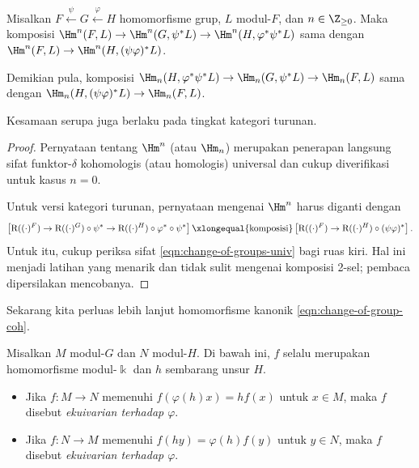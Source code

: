 \begin{lemma}\label{prop:change-of-group-compo}
	Misalkan $F\xleftarrow{\psi}G\xleftarrow{\varphi}H$ homomorfisme grup,
	$L$ modul-$F$, dan $n\in\Z_{\geq0}$. Maka komposisi
	$\Hm^n(F,L)\to\Hm^n(G,\psi^*L)\to
	\Hm^n(H,\varphi^*\psi^*L)$ sama dengan
	$\Hm^n(F,L)\to\Hm^n(H,(\psi\varphi)^*L)$.

	Demikian pula, komposisi
	$\Hm_n(H,\varphi^*\psi^*L)\to\Hm_n(G,\psi^*L)\to\Hm_n(F,L)$ sama dengan
	$\Hm_n(H,(\psi\varphi)^*L)\to\Hm_n(F,L)$.

	Kesamaan serupa juga berlaku pada tingkat kategori turunan.
\end{lemma}
\begin{proof}
	Pernyataan tentang $\Hm^n$ (atau $\Hm_n$) merupakan penerapan langsung
	sifat funktor-$\delta$ kohomologis (atau homologis) universal dan cukup
	diverifikasi untuk kasus $n=0$.

	Untuk versi kategori turunan, pernyataan mengenai $\Hm^n$ harus diganti
	dengan
	\[ \left[ \mathrm{R}((\cdot)^F) \to \mathrm{R}((\cdot)^G) \circ \psi^* \to \mathrm{R}((\cdot)^H) \circ \varphi^* \circ \psi^* \right] \xlongequal{\text{komposisi}} \left[ \mathrm{R}((\cdot)^F) \to \mathrm{R}((\cdot)^H) \circ (\psi\varphi)^* \right]. \]
	Untuk itu, cukup periksa sifat \eqref{eqn:change-of-groups-univ} bagi ruas
	kiri. Hal ini menjadi latihan yang menarik dan tidak sulit mengenai komposisi
	2-sel; pembaca dipersilakan mencobanya.
\end{proof}

Sekarang kita perluas lebih lanjut homomorfisme kanonik
\eqref{eqn:change-of-group-coh}.

\begin{definition}\label{def:group-equivariance}
	Misalkan $M$ modul-$G$ dan $N$ modul-$H$. Di bawah ini, $f$ selalu
	merupakan homomorfisme modul-$\Bbbk$ dan $h$ sembarang unsur $H$.
	\begin{itemize}
		\item Jika $f:M\to N$ memenuhi $f(\varphi(h)x)=hf(x)$ untuk $x\in M$,
		maka $f$ disebut \emph{ekuivarian terhadap $\varphi$}.
		\item Jika $f:N\to M$ memenuhi $f(hy)=\varphi(h)f(y)$ untuk $y\in N$,
		maka $f$ disebut \emph{ekuivarian terhadap $\varphi$}.
	\end{itemize}
\end{definition}

